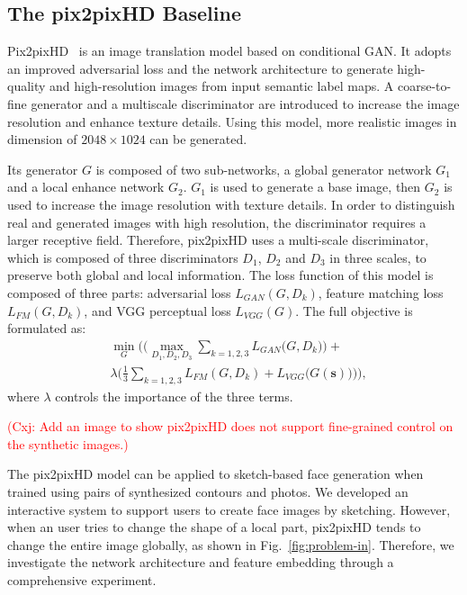 \documentclass[10pt,twocolumn,letterpaper]{article}
\newcommand{\cxj}[1]{\textcolor{red}{(Cxj: #1)}}
\begin{document}
\subsection{The pix2pixHD Baseline}\label{sec:pix2pixhd}
Pix2pixHD~\cite{pix2pixhd} is an image translation model based on conditional GAN.
It adopts an improved adversarial loss and the network architecture to generate high-quality and high-resolution images from input semantic label maps. 
A coarse-to-fine generator and a multiscale discriminator are introduced to increase the image resolution and enhance texture details.
Using this model, more realistic images in dimension of $2048 \times 1024$ can be generated. 

Its generator $G$ is composed of two sub-networks, a global generator network $G_1$ and a local enhance network $G_2$. 
$G_1$ is used to generate a base image, then $G_2$ is used to increase the image resolution with texture details. 
In order to distinguish real and generated images with high resolution, the discriminator requires a larger receptive field. 
Therefore, pix2pixHD uses a multi-scale discriminator, which is composed of three discriminators $D_1$, $D_2$ and $D_3$ in three scales, to preserve both global and local information. 
The loss function of this model is composed of three parts: adversarial loss $L_{GAN}(G,D_k)$, feature matching loss $L_{FM}(G,D_k)$, and VGG perceptual loss $L_{VGG}(G)$. The full objective is formulated as:
\begin{equation}
\begin{split}
	&\underset{G}{\min}\Bigg(\bigg(\underset{D_1,D_2,D_3}{\max} \sum_{k=1,2,3}{L_{GAN}\big(G,D_k\big)}\bigg)+  \\
	&\lambda \bigg(\frac{1}{3}\sum_{k=1,2,3}{L_{FM}(G,D_k)}+L_{VGG}{\big(G(\boldsymbol{s})\big)}\bigg)\Bigg),
\end{split}
\end{equation}
\noindent
where $\lambda$ controls the importance of the three terms.

\cxj{Add an image to show pix2pixHD does not support fine-grained control on the synthetic images.}

The pix2pixHD model can be applied to sketch-based face generation when trained using pairs of synthesized contours and photos. 
We developed an interactive system to support users to create face images by sketching. 
However, when an user tries to change the shape of a local part, pix2pixHD tends to change the entire image globally, as shown in Fig.~\ref{fig:problem-in}.
Therefore, we investigate the network architecture and feature embedding through a comprehensive experiment.
\end{document}
